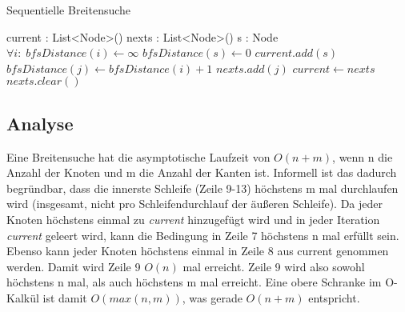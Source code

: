 \begin{algorithm}
	\caption{Sequentielle Breitensuche}
	\label{alg:sequential_bfs}
	\begin{algorithmic}[1]
		\State current : List<Node>()
		\State nexts : List<Node>()
		\State s : Node
		\State  $\forall i: \; bfsDistance(i) \gets \infty$
		\State $bfsDistance(s) \gets 0$
		\State $current.add(s)$
						\State $bfsDistance(j) \gets bfsDistance(i) + 1$
						\State $nexts.add(j)$
					\EndIf
				\EndFor
			\EndFor
			\State $current \gets nexts$
			\State $nexts.clear()$
		\EndWhile
	\end{algorithmic}
\end{algorithm}


\subsection{Analyse} %
\label{sub:analyse}
Eine Breitensuche hat die asymptotische Laufzeit von $O(n + m)$, wenn n die Anzahl der Knoten und m die Anzahl der Kanten ist. Informell ist das dadurch begründbar, dass die innerste Schleife (Zeile 9-13) höchstens m mal durchlaufen wird (insgesamt, nicht pro Schleifendurchlauf der äußeren Schleife). Da jeder Knoten höchstens einmal zu \textit{current} hinzugefügt wird und in jeder Iteration \textit{current} geleert wird, kann die Bedingung in Zeile 7 höchstens n mal erfüllt sein. Ebenso kann jeder Knoten höchstens einmal in Zeile 8 aus current genommen werden. Damit wird Zeile 9 $O(n)$ mal erreicht. Zeile 9 wird also sowohl höchstens n mal, als auch höchstens m mal erreicht. Eine obere Schranke im O-Kalkül ist damit $O(max(n,m))$, was gerade $O(n + m)$ entspricht.
